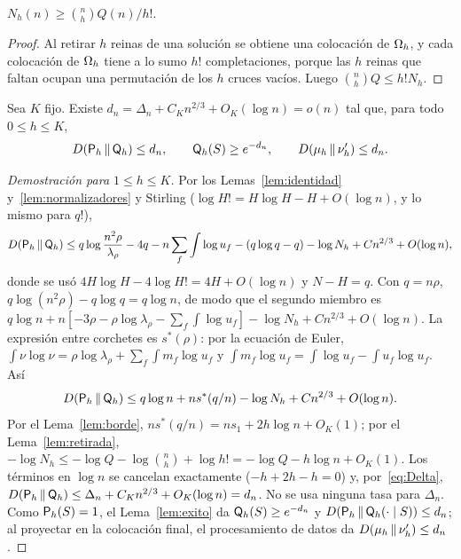 \begin{lema}\label{lem:retirada}
$N_h(n)\ge\binom nh Q(n)/h!$.
\end{lema}

\begin{proof}
Al retirar $h$ reinas de una solución se obtiene una colocación de $\Omega_h$, y cada
colocación de $\Omega_h$ tiene a lo sumo $h!$ completaciones, porque las $h$ reinas que faltan
ocupan una permutación de los $h$ cruces vacíos. Luego $\binom nhQ\le h!N_h$.
\end{proof}

\begin{teorema}\label{thm:comparacion}
Sea $K$ fijo. Existe $d_n=\Delta_n+C_Kn^{2/3}+O_K(\log n)=o(n)$ tal que, para todo
$0\le h\le K$,
\[
 D(\mathsf{P}_h\,\Vert\,\mathsf{Q}_h)\le d_n,\qquad \mathsf{Q}_h(S)\ge e^{-d_n},\qquad D(\mu_h\,\Vert\,\nu'_h)\le d_n .
\]
\end{teorema}

\begin{proof}[Demostración para $1\le h\le K$]
Por los Lemas~\ref{lem:identidad} y~\ref{lem:normalizadores} y Stirling
($\log H!=H\log H-H+O(\log n)$, y lo mismo para $q!$),
\[
 D(\mathsf{P}_h\,\Vert\,\mathsf{Q}_h)\le q\log\frac{n^2\rho}{\lambda_\rho}-4q-n\sum_f\int\log u_f-(q\log q-q)
 -\log N_h+Cn^{2/3}+O(\log n),
\]
donde se usó $4H\log H-4\log H!=4H+O(\log n)$ y $N-H=q$. Con $q=n\rho$,
$q\log(n^2\rho)-q\log q=q\log n$, de modo que el segundo miembro es
$q\log n+n[-3\rho-\rho\log\lambda_\rho-\sum_f\int\log u_f]-\log N_h+Cn^{2/3}+O(\log n)$. La
expresión entre corchetes es $s^*(\rho)$: por la ecuación de Euler,
$\int\nu\log\nu=\rho\log\lambda_\rho+\sum_f\int m_f\log u_f$ y
$\int m_f\log u_f=\int\log u_f-\int u_f\log u_f$. Así
\[
 D(\mathsf{P}_h\,\Vert\,\mathsf{Q}_h)\le q\log n+ns^*(q/n)-\log N_h+Cn^{2/3}+O(\log n).
\]
Por el Lema~\ref{lem:borde}, $ns^*(q/n)=ns_1+2h\log n+O_K(1)$; por el Lema~\ref{lem:retirada},
$-\log N_h\le-\log Q-\log\binom nh+\log h!=-\log Q-h\log n+O_K(1)$. Los términos en
$\log n$ se cancelan exactamente ($-h+2h-h=0$) y, por~\eqref{eq:Delta},
$D(\mathsf{P}_h\,\Vert\,\mathsf{Q}_h)\le\Delta_n+C_Kn^{2/3}+O_K(\log n)=d_n$. No se usa ninguna tasa para
$\Delta_n$. Como $\mathsf{P}_h(S)=1$, el Lema~\ref{lem:exito} da $\mathsf{Q}_h(S)\ge e^{-d_n}$ y
$D(\mathsf{P}_h\,\Vert\,\mathsf{Q}_h(\cdot\mid S))\le d_n$; al proyectar en la colocación final, el
procesamiento de datos da $D(\mu_h\,\Vert\,\nu'_h)\le d_n$.
\end{proof}
